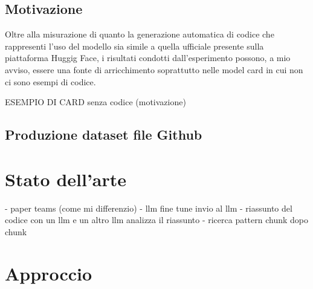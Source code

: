 \documentclass{article}
\begin{document}
\subsection{Motivazione}
Oltre alla misurazione di quanto la generazione automatica di codice che rappresenti l'uso del modello sia simile a quella ufficiale presente sulla piattaforma Huggig Face, i risultati condotti dall'esperimento possono, a mio avviso, essere una fonte di arricchimento soprattutto nelle model card in cui non ci sono esempi di codice.

ESEMPIO DI CARD senza codice (motivazione)

\subsection{Produzione dataset file Github}



\section{Stato dell'arte}
- paper teams (come mi differenzio)
- llm fine tune 
invio al llm
- riassunto del codice con un llm e un altro llm analizza il riassunto
- ricerca pattern chunk dopo chunk



\section{Approccio}
\end{document}
